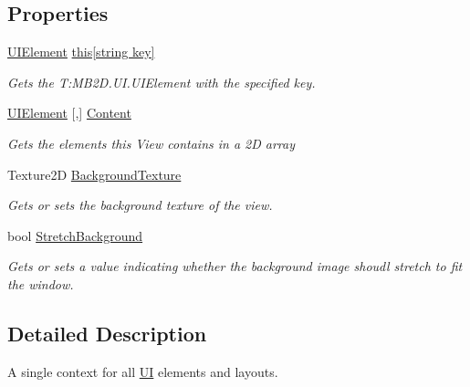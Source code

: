 \subsection*{Properties}
\begin{DoxyCompactItemize}
\item 
\hyperlink{class_m_b2_d_1_1_u_i_1_1_u_i_element}{U\+I\+Element} \hyperlink{class_m_b2_d_1_1_u_i_1_1_u_i_view_aa054a491e5acf3816240b671db3212ce}{this\mbox{[}string key\mbox{]}}
\begin{DoxyCompactList}\small\item\em Gets the T\+:\+M\+B2\+D.\+U\+I.\+U\+I\+Element with the specified key. \end{DoxyCompactList}\item 
\hyperlink{class_m_b2_d_1_1_u_i_1_1_u_i_element}{U\+I\+Element} \mbox{[},\mbox{]} \hyperlink{class_m_b2_d_1_1_u_i_1_1_u_i_view_a873fb2ef0e28bf1d96056e43a6fe18da}{Content}
\begin{DoxyCompactList}\small\item\em Gets the elements this View contains in a 2D array \end{DoxyCompactList}\item 
Texture2D \hyperlink{class_m_b2_d_1_1_u_i_1_1_u_i_view_a9d5bf0c4239df5a79429921bda80a1ad}{Background\+Texture}
\begin{DoxyCompactList}\small\item\em Gets or sets the background texture of the view. \end{DoxyCompactList}\item 
bool \hyperlink{class_m_b2_d_1_1_u_i_1_1_u_i_view_a715db505a27aeb27dd14c1108bda322f}{Stretch\+Background}
\begin{DoxyCompactList}\small\item\em Gets or sets a value indicating whether the background image shoudl stretch to fit the window. \end{DoxyCompactList}\end{DoxyCompactItemize}


\subsection{Detailed Description}
A single context for all \hyperlink{namespace_m_b2_d_1_1_u_i}{UI} elements and layouts. 



